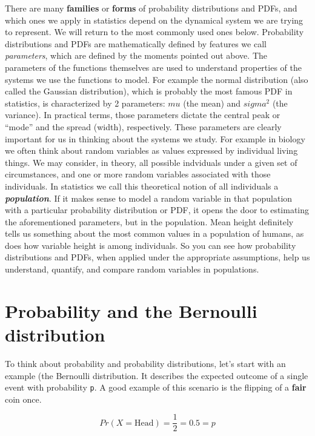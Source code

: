 \documentclass[]{book}
\begin{document}
There are many \textbf{families} or \textbf{forms} of probability distributions and PDFs, and which ones we apply in statistics depend on the dynamical system we are trying to represent. We will return to the most commonly used ones below. Probability distributions and PDFs are mathematically defined by features we call \emph{parameters}, which are defined by the moments pointed out above. The parameters of the functions themselves are used to understand properties of the systems we use the functions to model. For example the normal distribution (also called the Gaussian distribution), which is probably the most famous PDF in statistics, is characterized by 2 parameters: \(mu\) (the mean) and \(sigma^{2}\) (the variance). In practical terms, those parameters dictate the central peak or ``mode'' and the spread (width), respectively. These parameters are clearly important for us in thinking about the systems we study. For example in biology we often think about random variables as values expressed by individual living things. We may consider, in theory, all possible indviduals under a given set of circumstances, and one or more random variables associated with those individuals. In statistics we call this theoretical notion of all individuals a \textbf{\emph{population}}. If it makes sense to model a random variable in that population with a particular probability distribution or PDF, it opens the door to estimating the aforementioned parameters, but in the population. Mean height definitely tells us something about the most common values in a population of humans, as does how variable height is among individuals. So you can see how probability distributions and PDFs, when applied under the appropriate assumptions, help us understand, quantify, and compare random variables in populations.

\hypertarget{probability-and-the-bernoulli-distribution}{%
\section{Probability and the Bernoulli distribution}\label{probability-and-the-bernoulli-distribution}}

To think about probability and probability distributions, let's start with an example (the Bernoulli distribution. It describes the expected outcome of a single event with probability \texttt{p}. A good example of this scenario is the flipping of a \textbf{fair} coin once.

\[Pr(X=\text{Head}) = \frac{1}{2} = 0.5 = p \]
\end{document}
